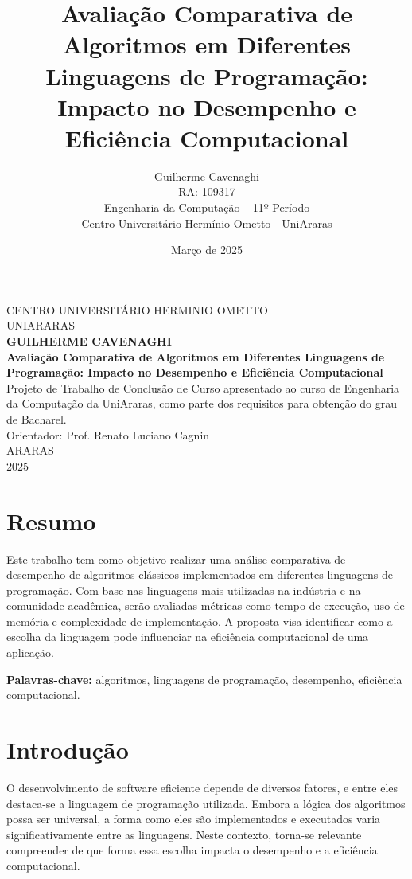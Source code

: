 \documentclass[12pt,oneside,a4paper]{report}
\title{\textbf{Avaliação Comparativa de Algoritmos em Diferentes Linguagens de Programação: Impacto no Desempenho e Eficiência Computacional}}
\author{Guilherme Cavenaghi \\ RA: 109317 \\ Engenharia da Computação -- 11º Período \\ Centro Universitário Hermínio Ometto - UniAraras}
\date{Março de 2025}
\begin{document}
\begin{titlepage}
    \begin{center}
        \large
        CENTRO UNIVERSITÁRIO HERMINIO OMETTO\\
        UNIARARAS\\[1.5cm]

        \textbf{GUILHERME CAVENAGHI}\\[5cm]

        \textbf{\Large Avaliação Comparativa de Algoritmos em Diferentes Linguagens de Programação: Impacto no Desempenho e Eficiência Computacional}\\[1.5cm]

        Projeto de Trabalho de Conclusão de Curso apresentado ao curso de Engenharia da Computação da UniAraras, como parte dos requisitos para obtenção do grau de Bacharel.\\[0.5cm]

        Orientador: Prof. Renato Luciano Cagnin\\[3cm]

        ARARAS\\
        2025
    \end{center}
\end{titlepage}

\chapter*{Resumo}
Este trabalho tem como objetivo realizar uma análise comparativa de desempenho de algoritmos clássicos implementados em diferentes linguagens de programação. Com base nas linguagens mais utilizadas na indústria e na comunidade acadêmica, serão avaliadas métricas como tempo de execução, uso de memória e complexidade de implementação. A proposta visa identificar como a escolha da linguagem pode influenciar na eficiência computacional de uma aplicação.

\textbf{Palavras-chave:} algoritmos, linguagens de programação, desempenho, eficiência computacional.

\chapter{Introdução}
O desenvolvimento de software eficiente depende de diversos fatores, e entre eles destaca-se a linguagem de programação utilizada. Embora a lógica dos algoritmos possa ser universal, a forma como eles são implementados e executados varia significativamente entre as linguagens. Neste contexto, torna-se relevante compreender de que forma essa escolha impacta o desempenho e a eficiência computacional.
\end{document}
